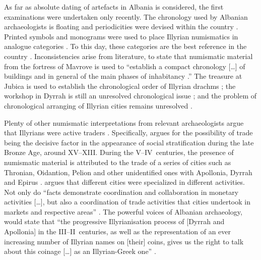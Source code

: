 	As far as absolute dating of artefacts in Albania is considered, the first examinations were undertaken only recently. The chronology used by Albanian archaeologists is floating and periodicities were devised within the country \parencite[271]{Aliu1985}. Printed symbols and monograms were used to place Illyrian numismatics in analogue categories \parencite[369]{Ceka1974}. To this day, these categories are the best reference in the country \parencite[242]{Sasianu1987}. Inconsistencies arise from literature, to state that numismatic material from the fortress of Mavrove is used to ``establish a compact chronology [\ldots] of buildings and in general of the main phases of inhabitancy \parencite[trans.][65]{Dautaj1981}.'' The treasure at Jubica is used to establish the chronological order of Illyrian drachms \parencite{Ceka1971}; the workshop in Dyrrah is still an unresolved chronological issue \parencite{Ceka1974}; and the problem of chronological arranging of Illyrian cities remains unresolved \parencites{Islami1972}{Islami2008}.
	

Plenty of other numismatic interpretations from relevant archaeologists argue that Illyrians were active traders \parencites{Mano1986}{Mano2006}{Ceka1965}{Ceka1974}{Gjongecaj1985}{Gjongecaj1986}{Gjongecaj1990}{Picard1986}{Picard1995}. 
Specifically, \textcite[94]{Prendi1985} argues for the possibility of trade being the decisive factor in the appearance of social stratification during the late Bronze Age, around XV--XIII\BC. During the V--IV\ centuries\BC, the presence of numismatic material is attributed to the trade of a series of cities such as Thronian, Oidantion, Pelion and other unidentified ones with Apollonia, Dyrrah and Epirus \parencite[112--113]{Prendi1974}. \textcite{Mano1974} argues that different cities were specialized in different activities. Not only do ``facts demonstrate coordination and collaboration in monetary activities [\ldots], but also a coordination of trade activities that cities undertook in markets and respective areas'' \parencite[trans.][388]{Mano1974}. The powerful voices of Albanian archaeology, would state that ``the progressive Illyrianisation process of [Dyrrah and Apollonia] in the III--II\ centuries\BC, as well as the representation of an ever increasing number of Illyrian names on [their] coins, gives us the right to talk about this coinage [\ldots] as an Illyrian-Greek one'' \parencite[trans.][164]{Stripceviq1980}.

